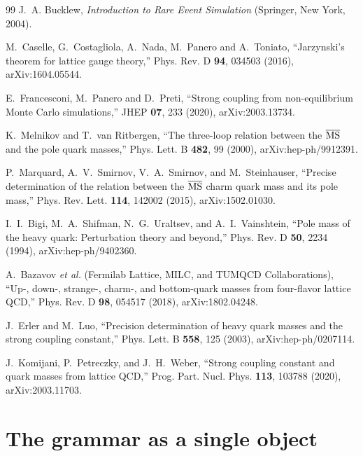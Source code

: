\documentclass[aps,twocolumn,superscriptaddress,nofootinbib,floatfix]{revtex4-2}
\begin{document}
\begin{thebibliography}{99}
J.~A. Bucklew, {\it Introduction to Rare Event Simulation} (Springer, New York, 2004).

M.~Caselle, G.~Costagliola, A.~Nada, M.~Panero and A.~Toniato, ``Jarzynski's theorem for lattice gauge theory,'' Phys. Rev. D \textbf{94}, 034503 (2016), arXiv:1604.05544.

E.~Francesconi, M.~Panero and D.~Preti, ``Strong coupling from non-equilibrium Monte Carlo simulations,'' JHEP \textbf{07}, 233 (2020), arXiv:2003.13734.

K.~Melnikov and T.~van Ritbergen, ``The three-loop relation between the $\overline{\rm MS}$ and the pole quark masses,'' Phys. Lett. B \textbf{482}, 99 (2000), arXiv:hep-ph/9912391.

P.~Marquard, A.~V.~Smirnov, V.~A.~Smirnov, and M.~Steinhauser, ``Precise determination of the relation between the $\overline{\rm MS}$ charm quark mass and its pole mass,'' Phys. Rev. Lett. \textbf{114}, 142002 (2015), arXiv:1502.01030.

I.~I.~Bigi, M.~A.~Shifman, N.~G.~Uraltsev, and A.~I.~Vainshtein, ``Pole mass of the heavy quark: Perturbation theory and beyond,'' Phys. Rev. D \textbf{50}, 2234 (1994), arXiv:hep-ph/9402360.

A.~Bazavov \textit{et al.} (Fermilab Lattice, MILC, and TUMQCD Collaborations), ``Up-, down-, strange-, charm-, and bottom-quark masses from four-flavor lattice QCD,'' Phys. Rev. D \textbf{98}, 054517 (2018), arXiv:1802.04248.

J.~Erler and M.~Luo, ``Precision determination of heavy quark masses and the strong coupling constant,'' Phys. Lett. B \textbf{558}, 125 (2003), arXiv:hep-ph/0207114.

J.~Komijani, P.~Petreczky, and J.~H.~Weber, ``Strong coupling constant and quark masses from lattice QCD,'' Prog. Part. Nucl. Phys. \textbf{113}, 103788 (2020), arXiv:2003.11703.

\end{thebibliography}

\appendix

\section{The grammar as a single object}
\label{app:grammar}
\end{document}
